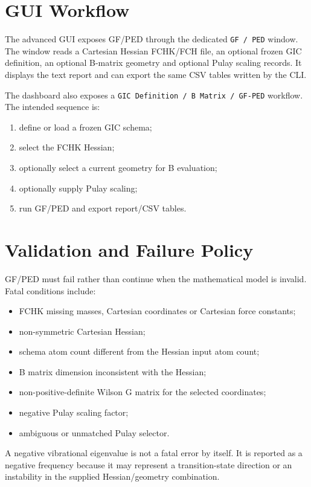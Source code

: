 \documentclass[11pt]{article}
\begin{document}
\section{GUI Workflow}

The advanced GUI exposes GF/PED through the dedicated \texttt{GF / PED} window.
The window reads a Cartesian Hessian FCHK/FCH file, an optional frozen GIC
definition, an optional B-matrix geometry and optional Pulay scaling records.
It displays the text report and can export the same CSV tables written by the
CLI.

The dashboard also exposes a \texttt{GIC Definition / B Matrix / GF-PED}
workflow.  The intended sequence is:

\begin{enumerate}
  \item define or load a frozen GIC schema;
  \item select the FCHK Hessian;
  \item optionally select a current geometry for B evaluation;
  \item optionally supply Pulay scaling;
  \item run GF/PED and export report/CSV tables.
\end{enumerate}

\section{Validation and Failure Policy}

GF/PED must fail rather than continue when the mathematical model is invalid.
Fatal conditions include:

\begin{itemize}
  \item FCHK missing masses, Cartesian coordinates or Cartesian force constants;
  \item non-symmetric Cartesian Hessian;
  \item schema atom count different from the Hessian input atom count;
  \item B matrix dimension inconsistent with the Hessian;
  \item non-positive-definite Wilson G matrix for the selected coordinates;
  \item negative Pulay scaling factor;
  \item ambiguous or unmatched Pulay selector.
\end{itemize}

\noindent
A negative vibrational eigenvalue is not a fatal error by itself.  It is
reported as a negative frequency because it may represent a transition-state
direction or an instability in the supplied Hessian/geometry combination.
\end{document}

